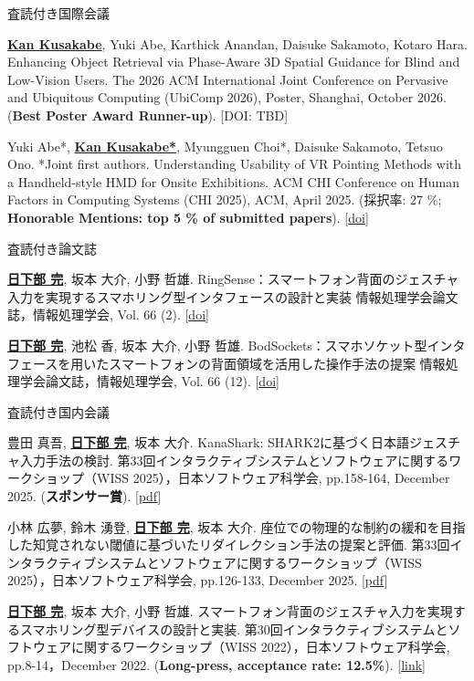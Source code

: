 \documentclass[
	11pt, %
]{resume} %
\begin{document}
\begin{rSection}{査読付き国際会議}{}{}{}
		\item \underline{\textbf{Kan Kusakabe}}, Yuki Abe, Karthick Anandan, Daisuke Sakamoto, Kotaro Hara. Enhancing Object Retrieval via Phase-Aware 3D Spatial Guidance for Blind and Low-Vision Users. The 2026 ACM International Joint Conference on Pervasive and Ubiquitous Computing (UbiComp 2026), Poster, Shanghai, October 2026. (\textbf{Best Poster Award Runner-up}). [DOI: TBD]
		\item Yuki Abe*, \underline{\textbf{Kan Kusakabe*}}, Myungguen Choi*, Daisuke Sakamoto, Tetsuo Ono. *Joint first authors. Understanding Usability of VR Pointing Methods with a Handheld-style HMD for Onsite Exhibitions. ACM CHI Conference on Human Factors in Computing Systems (CHI 2025), ACM, April 2025. (採択率: 27 \%; \textbf{Honorable Mentions: top 5 \% of submitted papers}). [\href{https://doi.org/10.1145/3706598.3713874}{doi}]
\end{rSection}

\begin{rSection}{査読付き論文誌}{}{}{}
	\item \underline{\textbf{日下部 完}}, 坂本 大介, 小野 哲雄. RingSense：スマートフォン背面のジェスチャ入力を実現するスマホリング型インタフェースの設計と実装 情報処理学会論文誌，情報処理学会, Vol. 66 (2). [\href{https://doi.org/10.20729/0002000028}{doi}]
	\item \underline{\textbf{日下部 完}}, 池松 香, 坂本 大介, 小野 哲雄. BodSockets：スマホソケット型インタフェースを用いたスマートフォンの背面領域を活用した操作手法の提案 情報処理学会論文誌，情報処理学会, Vol. 66 (12). [\href{https://doi.org/10.20729/0002006344}{doi}]
\end{rSection}

\begin{rSection}{査読付き国内会議}{}{}{}
		\item 豊田 真吾, \underline{\textbf{日下部 完}}, 坂本 大介. KanaShark: SHARK2に基づく日本語ジェスチャ入力手法の検討. 第33回インタラクティブシステムとソフトウェアに関するワークショップ（WISS 2025），日本ソフトウェア科学会, pp.158-164, December 2025. (\textbf{スポンサー賞}). [\href{https://www.wiss.org/WISS2025/downloads/proceedings.pdf}{pdf}]
		\item 小林 広夢, 鈴木 湧登, \underline{\textbf{日下部 完}}, 坂本 大介. 座位での物理的な制約の緩和を目指した知覚されない閾値に基づいたリダイレクション手法の提案と評価. 第33回インタラクティブシステムとソフトウェアに関するワークショップ（WISS 2025），日本ソフトウェア科学会, pp.126-133, December 2025. [\href{https://www.wiss.org/WISS2025/downloads/proceedings.pdf}{pdf}]
		\item \underline{\textbf{日下部 完}}, 坂本 大介, 小野 哲雄. スマートフォン背面のジェスチャ入力を実現するスマホリング型デバイスの設計と実装. 第30回インタラクティブシステムとソフトウェアに関するワークショップ（WISS 2022），日本ソフトウェア科学会, pp.8-14，December 2022. (\textbf{Long-press, acceptance rate: 12.5\%}). [\href{https://www.wiss.org/WISS2022Proceedings/data/02.pdf}{link}]
\end{rSection}
\end{document}
